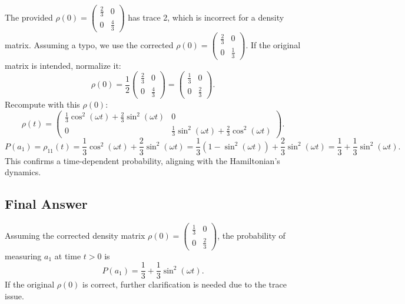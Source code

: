 \documentclass[a4paper,12pt]{article}
\begin{document}
The provided \(\rho(0) = \begin{pmatrix} \frac{2}{3} & 0 \\ 0 & \frac{4}{3} \end{pmatrix}\) has trace 2, which is incorrect for a density matrix. Assuming a typo, we use the corrected \(\rho(0) = \begin{pmatrix} \frac{2}{3} & 0 \\ 0 & \frac{1}{3} \end{pmatrix}\). If the original matrix is intended, normalize it:
\[
\rho(0) = \frac{1}{2} \begin{pmatrix} \frac{2}{3} & 0 \\ 0 & \frac{4}{3} \end{pmatrix} = \begin{pmatrix} \frac{1}{3} & 0 \\ 0 & \frac{2}{3} \end{pmatrix}.
\]
Recompute with this \(\rho(0)\):
\[
\rho(t) = \begin{pmatrix} \frac{1}{3} \cos^2(\omega t) + \frac{2}{3} \sin^2(\omega t) & 0 \\ 0 & \frac{1}{3} \sin^2(\omega t) + \frac{2}{3} \cos^2(\omega t) \end{pmatrix}.
\]
\[
P(a_1) = \rho_{11}(t) = \frac{1}{3} \cos^2(\omega t) + \frac{2}{3} \sin^2(\omega t) = \frac{1}{3} (1 - \sin^2(\omega t)) + \frac{2}{3} \sin^2(\omega t) = \frac{1}{3} + \frac{1}{3} \sin^2(\omega t).
\]
This confirms a time-dependent probability, aligning with the Hamiltonian's dynamics.

\subsection*{Final Answer}

Assuming the corrected density matrix \(\rho(0) = \begin{pmatrix} \frac{1}{3} & 0 \\ 0 & \frac{2}{3} \end{pmatrix}\), the probability of measuring \(a_1\) at time \(t > 0\) is
\[
P(a_1) = \frac{1}{3} + \frac{1}{3} \sin^2(\omega t).
\]
If the original \(\rho(0)\) is correct, further clarification is needed due to the trace issue.
\end{document}
